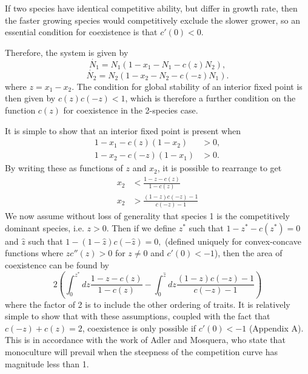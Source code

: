 If two species have identical competitive ability, but differ in growth rate, then the faster growing species would competitively exclude the slower grower, so an essential condition for coexistence is that $c'(0) <0$. 
 
Therefore, the system is given by
\begin{equation}
 \dot{N_1}=N_1\left(1-x_1 -N_1-c(z)N_2\right),
\end{equation}
\begin{equation}
  \dot{N_2}=N_2\left(1-x_2 -N_2-c(-z)N_1\right).
  \end{equation}
  where $z=x_1-x_2$. The condition for global stability of an interior fixed point is then given by $c(z)c(-z)<1$, which is therefore a further condition on the function $c(z)$ for coexistence in the 2-species case.

It is simple to show that an interior fixed point is present when 
\begin{align}
1-x_1-c(z)(1-x_2)&>0, \\
1-x_2-c(-z)(1-x_1)&>0. \end{align}
By writing these as functions of $z$ and $x_2$, it is possible to rearrange to get
\begin{align}
\label{x2upper}
x_2&<\frac{1-z-c(z)}{1-c(z)} \\
\label{x2lower}x_2&>\frac{(1-z)c(-z)-1}{c(-z)-1} \end{align}
We now assume without loss of generality that species 1 is the competitively dominant species, i.e. $z>0$. Then if we define $z^*$ such that
$
1-z^*-c(z^*)=0$
and $\hat{z}$ such that
$1-(1-\hat{z})c(-\hat{z})=0,$
 (defined uniquely for convex-concave functions where $z c''(z)>0$ for $z\neq0$ and $c'(0)<-1$),
then the area of coexistence can be found by
\begin{equation}
\label{areacoexist}
2\left( \int^{z^*}_0 dz \frac{1-z-c(z)}{1-c(z)} - \int^{\hat{z}}_0 dz \frac{(1-z)c(-z)-1}{c(-z)-1} \right)
\end{equation}
where the factor of 2 is to include the other ordering of traits. It is relatively simple to show that with these assumptions, coupled with the fact that $c(-z)+c(z)=2$, coexistence is only possible if $c'(0)<-1$ (Appendix A). This is in accordance with the work of Adler and Mosquera, who state that monoculture will prevail when the steepness of the competition curve has magnitude less than 1.

